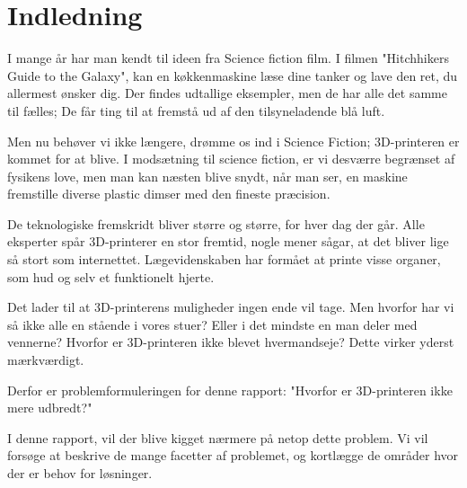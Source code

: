 \chapter{Indledning} %
\label{cha:Indledning}

I mange år har man kendt til ideen fra Science fiction film. I filmen "Hitchhikers Guide to the Galaxy", kan en køkkenmaskine læse dine tanker og lave den ret, du allermest ønsker dig. Der findes udtallige eksempler, men de har alle det samme til fælles; De får ting til at fremstå ud af den tilsyneladende blå luft.

Men nu behøver vi ikke længere, drømme os ind i Science Fiction; 3D-printeren er kommet for at blive. I modsætning til science fiction, er vi desværre begrænset af fysikens love, men man kan næsten blive snydt, når man ser, en maskine fremstille diverse plastic dimser med den fineste præcision.

De teknologiske fremskridt bliver større og større, for hver dag der går. Alle eksperter spår 3D-printerer en stor fremtid, nogle mener sågar, at det bliver lige så stort som internettet. Lægevidenskaben har formået at printe visse organer, som hud og selv et funktionelt hjerte.

Det lader til at 3D-printerens muligheder ingen ende vil tage. Men hvorfor har vi så ikke alle en stående i vores stuer? Eller i det mindste en man deler med vennerne? Hvorfor er 3D-printeren ikke blevet hvermandseje? Dette virker yderst mærkværdigt. 

Derfor er problemformuleringen for denne rapport: "Hvorfor er 3D-printeren ikke mere udbredt?"

I denne rapport, vil der blive kigget nærmere på netop dette problem. Vi vil forsøge at beskrive de mange facetter af problemet, og kortlægge de områder hvor der er behov for løsninger.


